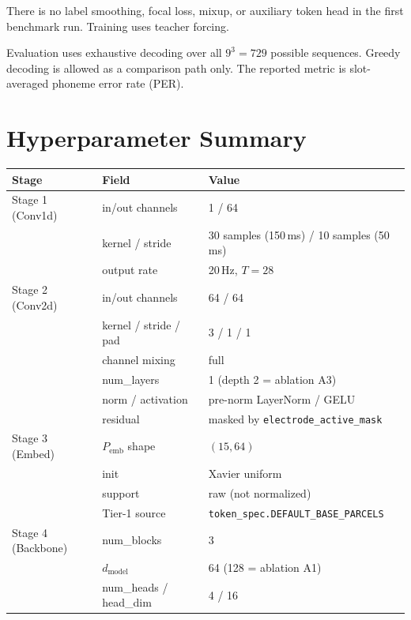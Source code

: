 \documentclass[11pt,letterpaper]{article}
\begin{document}
There is no label smoothing, focal loss, mixup, or auxiliary token head in the first benchmark run. Training uses teacher forcing.

Evaluation uses exhaustive decoding over all $9^3 = 729$ possible sequences. Greedy decoding is allowed as a comparison path only. The reported metric is slot-averaged phoneme error rate (PER).


\section{Hyperparameter Summary}

\begin{center}
\small
\begin{tabular}{@{}p{3.4cm} p{4.0cm} p{7.6cm}@{}}
\toprule
\textbf{Stage} & \textbf{Field} & \textbf{Value} \\
\midrule
Stage 1 (Conv1d) & in/out channels & 1 / 64 \\
                 & kernel / stride & 30 samples (150\,ms) / 10 samples (50\,ms) \\
                 & output rate     & 20\,Hz, $T = 28$ \\
\midrule
Stage 2 (Conv2d) & in/out channels & 64 / 64 \\
                 & kernel / stride / pad & 3 / 1 / 1 \\
                 & channel mixing  & full \\
                 & num\_layers     & 1 (depth 2 = ablation A3) \\
                 & norm / activation & pre-norm LayerNorm / GELU \\
                 & residual        & masked by \texttt{electrode\_active\_mask} \\
\midrule
Stage 3 (Embed)  & $P_{\text{emb}}$ shape & $(15, 64)$ \\
                 & init             & Xavier uniform \\
                 & support          & raw (not normalized) \\
                 & Tier-1 source    & \texttt{token\_spec.DEFAULT\_BASE\_PARCELS} \\
\midrule
Stage 4 (Backbone) & num\_blocks    & 3 \\
                 & $d_{\text{model}}$ & 64 (128 = ablation A1) \\
                 & num\_heads / head\_dim & 4 / 16 \\

\end{tabular}
\end{center}
\end{document}

